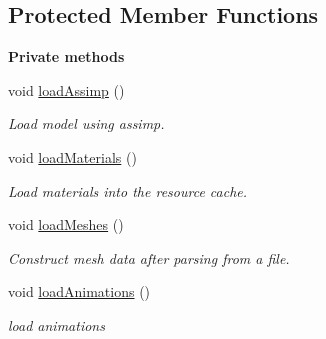 \subsection*{Protected Member Functions}
\begin{Indent}\textbf{ Private methods}\par
\begin{DoxyCompactItemize}
\item 
\mbox{\label{classrev_1_1_model_reader_ab4e3bfc0f3d31aeb4fa9a133d012e2b3}} 
void \mbox{\hyperlink{classrev_1_1_model_reader_ab4e3bfc0f3d31aeb4fa9a133d012e2b3}{load\+Assimp}} ()
\begin{DoxyCompactList}\small\item\em Load model using assimp. \end{DoxyCompactList}\item 
\mbox{\label{classrev_1_1_model_reader_a03a4770f949307d5949c52221b894151}} 
void \mbox{\hyperlink{classrev_1_1_model_reader_a03a4770f949307d5949c52221b894151}{load\+Materials}} ()
\begin{DoxyCompactList}\small\item\em Load materials into the resource cache. \end{DoxyCompactList}\item 
\mbox{\label{classrev_1_1_model_reader_a675283f2ca6721765583f58abe3aac30}} 
void \mbox{\hyperlink{classrev_1_1_model_reader_a675283f2ca6721765583f58abe3aac30}{load\+Meshes}} ()
\begin{DoxyCompactList}\small\item\em Construct mesh data after parsing from a file. \end{DoxyCompactList}\item 
\mbox{\label{classrev_1_1_model_reader_a727336bc87687aba1ee9152e27c6a304}} 
void \mbox{\hyperlink{classrev_1_1_model_reader_a727336bc87687aba1ee9152e27c6a304}{load\+Animations}} ()
\begin{DoxyCompactList}\small\item\em load animations \end{DoxyCompactList}\item 
\mbox{\label{classrev_1_1_model_reader_a0c82cee6bd17b57abe2e1594f661e037}} 

\end{DoxyCompactItemize}
\end{Indent}
